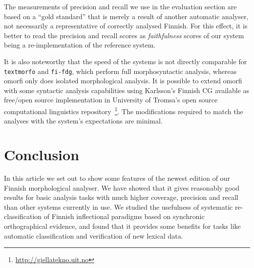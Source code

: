 \documentclass[a4paper,12pt]{article}
\begin{document}
The measurements of precision and recall we use in the evaluation section are
based on a ``gold standard'' that is merely a result of another automatic
analyser, not necessarily a representative of correctly analysed Finnish. For
this effect, it is better to read the precision and recall scores as 
\emph{faithfulness} scores of our system being a re-implementation of the
reference system.

It is also noteworthy that the speed of the systems is not directly comparable
for \texttt{textmorfo} and \texttt{fi-fdg}, which perform full morphosyntactic
analysis, whereas omorfi only does isolated morphological analysis. It is
possible to extend omorfi with some syntactic analysis capabilities using
Karlsson's Finnish CG available as free/open source implementation
in University of Tromsa's open source computational linguistics 
repository~\footnote{\url{http://giellatekno.uit.no}}. The modifications
required to match the analyses with the system's expectations are minimal.

\section{Conclusion}
\label{sec:conclusion}

In this article we set out to show some features of the newest edition of our
Finnish morphological analyser. We have showed that it gives reasonably good
results for basic analysis tasks with much higher coverage, precision and recall
than other systems currently in use. We studied the usefulness of systematic
re-classification of Finnish inflectional paradigms based on synchronic
orthographical evidence, and found that it provides some benefits for tasks
like automatic classification and verification of new lexical data.



\end{document}
